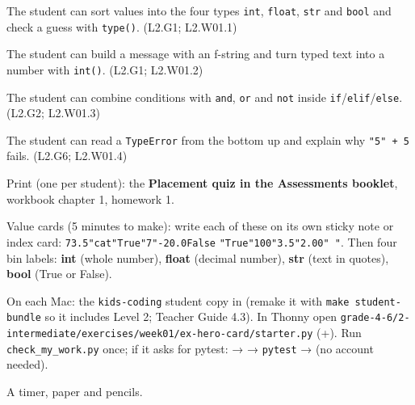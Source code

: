 
\begin{objectives}
  \item The student can sort values into the four types \texttt{int}, \texttt{float}, \texttt{str} and \texttt{bool} and check a guess with \texttt{type()}. (L2.G1; L2.W01.1)
  \item The student can build a message with an f-string and turn typed text into a number with \texttt{int()}. (L2.G1; L2.W01.2)
  \item The student can combine conditions with \texttt{and}, \texttt{or} and \texttt{not} inside \texttt{if}/\texttt{elif}/\texttt{else}. (L2.G2; L2.W01.3)
  \item The student can read a \texttt{TypeError} from the bottom up and explain why \texttt{"5" + 5} fails. (L2.G6; L2.W01.4)
\end{objectives}

\begin{materials}
  \item Print (one per student): the \textbf{Placement quiz in the Assessments booklet}, workbook chapter 1, homework 1.
  \item Value cards (5 minutes to make): write each of these on its own sticky note or index card:
        \texttt{7}\quad \texttt{3.5}\quad \texttt{"cat"}\quad \texttt{True}\quad \texttt{"7"}\quad \texttt{-2}\quad \texttt{0.0}\quad \texttt{False}\quad
        \texttt{"True"}\quad \texttt{100}\quad \texttt{"3.5"}\quad \texttt{2.0}\quad \texttt{0}\quad \texttt{" "}.
        Then four bin labels: \textbf{int} (whole number), \textbf{float} (decimal number), \textbf{str} (text in quotes), \textbf{bool} (True or False).
  \item On each Mac: the \texttt{kids-coding} student copy in  (remake it with \texttt{make student-bundle} so it includes Level 2; Teacher Guide 4.3). In Thonny open
        \texttt{grade-4-6/2-intermediate/exercises/week01/ex-hero-card/starter.py} (+). Run \texttt{check\_my\_work.py} once; if it asks
        for pytest:  →  → \texttt{pytest} →  (no account needed).
  \item A timer, paper and pencils.
\end{materials}

